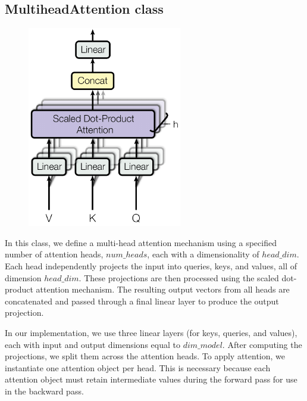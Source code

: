 \documentclass{../../../extra/aakpract/aakpract}
\begin{document}
\subsection{MultiheadAttention class}

\begin{figure}
	\centering
	\includegraphics[width=\linewidth]{img/multi_head_att2_.pdf}
\end{figure}

In this class, we define a multi-head attention mechanism using a specified number of attention heads, $ num\_heads $, each with a dimensionality of $ head\_dim $. 
Each head independently projects the input into queries, keys, and values, all of dimension $ head\_dim $. 
These projections are then processed using the scaled dot-product attention mechanism. 
The resulting output vectors from all heads are concatenated and passed through a final linear layer to produce the output projection.

In our implementation, we use three linear layers (for keys, queries, and values), each with input and output dimensions equal to $dim\_model$. 
After computing the projections, we split them across the attention heads. 
To apply attention, we instantiate one attention object per head.
This is necessary because each attention object must retain intermediate values during the forward pass for use in the backward pass.
\end{document}
